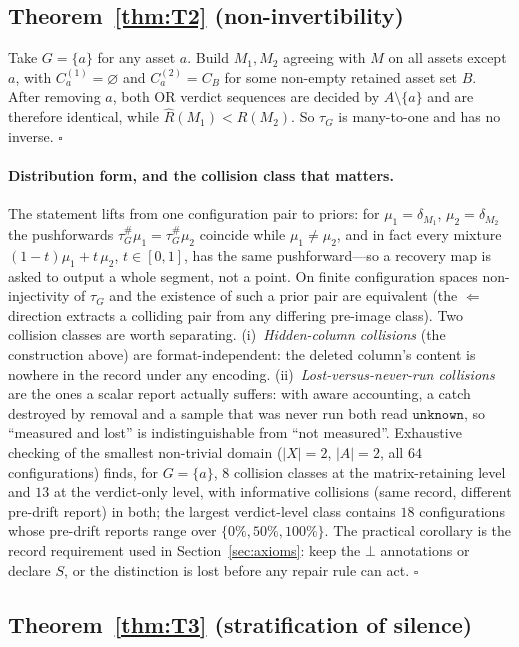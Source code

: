 \documentclass{article}
\newcommand{\Rhat}{\hat R}
\newcommand{\unk}{\texttt{unknown}}
\begin{document}
\subsection*{Theorem~\ref{thm:T2} (non-invertibility)}

Take $G=\{a\}$ for any asset $a$. Build $M_1,M_2$ agreeing with $M$ on all assets except $a$, with
$C_a^{(1)}=\varnothing$ and $C_a^{(2)}=C_B$ for some non-empty retained asset set $B$. After removing $a$,
both OR verdict sequences are decided by $A\setminus\{a\}$ and are therefore identical, while
$\Rhat(M_1)<\Rhat(M_2)$. So $\tau_G$ is many-to-one and has no inverse. $\square$

\paragraph{Distribution form, and the collision class that matters.} The statement lifts from one
configuration pair to priors: for $\mu_1=\delta_{M_1}$, $\mu_2=\delta_{M_2}$ the pushforwards
$\tau_G^{\#}\mu_1=\tau_G^{\#}\mu_2$ coincide while $\mu_1\neq\mu_2$, and in fact every mixture
$(1-t)\mu_1+t\,\mu_2$, $t\in[0,1]$, has the same pushforward---so a recovery map is asked to output a whole
segment, not a point. On finite configuration spaces non-injectivity of $\tau_G$ and the existence of such a
prior pair are equivalent (the $\Leftarrow$ direction extracts a colliding pair from any differing
pre-image class). Two collision classes are worth separating. (i)~\emph{Hidden-column collisions} (the
construction above) are format-independent: the deleted column's content is nowhere in the record under any
encoding. (ii)~\emph{Lost-versus-never-run collisions} are the ones a scalar report actually suffers: with
aware accounting, a catch destroyed by removal and a sample that was never run both read $\unk$, so
``measured and lost'' is indistinguishable from ``not measured''. Exhaustive checking of the smallest
non-trivial domain ($|X|=2$, $|A|=2$, all $64$ configurations) finds, for $G=\{a\}$, $8$ collision classes
at the matrix-retaining level and $13$ at the verdict-only level, with informative collisions (same record,
different pre-drift report) in both; the largest verdict-level class contains $18$ configurations whose
pre-drift reports range over $\{0\%,50\%,100\%\}$. The practical corollary is the record requirement used in
Section~\ref{sec:axioms}: keep the $\bot$ annotations or declare $S$, or the distinction is lost before any
repair rule can act. $\square$

\subsection*{Theorem~\ref{thm:T3} (stratification of silence)}
\end{document}
